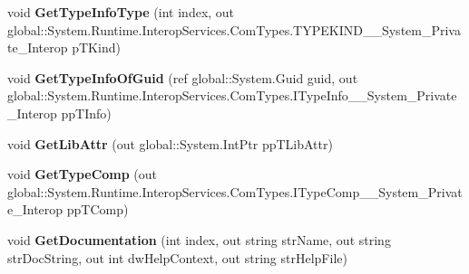 \begin{DoxyCompactItemize}
\item 
\mbox{\label{interface_system_1_1_runtime_1_1_interop_services_1_1_com_types_1_1_i_type_lib_____system___private___interop_a986454fa9fc37dfd64ab594c0fc42232}} 
void {\bfseries Get\+Type\+Info\+Type} (int index, out global\+::\+System.\+Runtime.\+Interop\+Services.\+Com\+Types.\+T\+Y\+P\+E\+K\+I\+N\+D\+\_\+\+\_\+\+System\+\_\+\+Private\+\_\+\+Interop p\+T\+Kind)
\item 
\mbox{\label{interface_system_1_1_runtime_1_1_interop_services_1_1_com_types_1_1_i_type_lib_____system___private___interop_a29c3f76d3f2e6750db6203a42ad93a69}} 
void {\bfseries Get\+Type\+Info\+Of\+Guid} (ref global\+::\+System.\+Guid guid, out global\+::\+System.\+Runtime.\+Interop\+Services.\+Com\+Types.\+I\+Type\+Info\+\_\+\+\_\+\+System\+\_\+\+Private\+\_\+\+Interop pp\+T\+Info)
\item 
\mbox{\label{interface_system_1_1_runtime_1_1_interop_services_1_1_com_types_1_1_i_type_lib_____system___private___interop_ac1b35c8576242797a74466d7999c3d30}} 
void {\bfseries Get\+Lib\+Attr} (out global\+::\+System.\+Int\+Ptr pp\+T\+Lib\+Attr)
\item 
\mbox{\label{interface_system_1_1_runtime_1_1_interop_services_1_1_com_types_1_1_i_type_lib_____system___private___interop_a1ec943ec9b2d14dd70c3367706164a45}} 
void {\bfseries Get\+Type\+Comp} (out global\+::\+System.\+Runtime.\+Interop\+Services.\+Com\+Types.\+I\+Type\+Comp\+\_\+\+\_\+\+System\+\_\+\+Private\+\_\+\+Interop pp\+T\+Comp)
\item 
\mbox{\label{interface_system_1_1_runtime_1_1_interop_services_1_1_com_types_1_1_i_type_lib_____system___private___interop_aff9e8eca4346610e25643d0f21d2bb4f}} 
void {\bfseries Get\+Documentation} (int index, out string str\+Name, out string str\+Doc\+String, out int dw\+Help\+Context, out string str\+Help\+File)

\end{DoxyCompactItemize}
